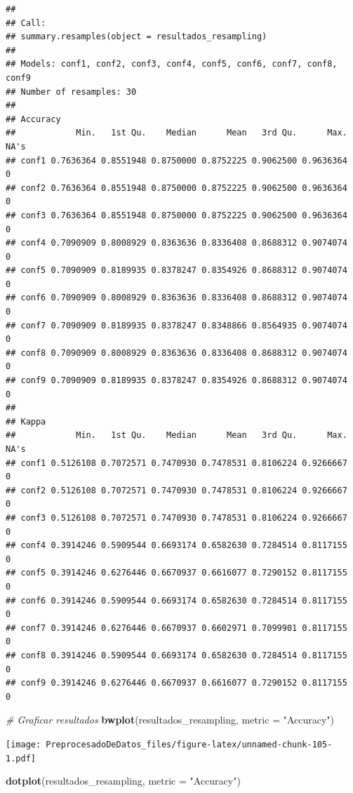 \documentclass[
]{article}
\newenvironment{Shaded}{\begin{snugshade}}{\end{snugshade}}
\newcommand{\AttributeTok}[1]{\textcolor[rgb]{0.13,0.29,0.53}{#1}}
\newcommand{\CommentTok}[1]{\textcolor[rgb]{0.56,0.35,0.01}{\textit{#1}}}
\newcommand{\FunctionTok}[1]{\textcolor[rgb]{0.13,0.29,0.53}{\textbf{#1}}}
\newcommand{\NormalTok}[1]{#1}
\newcommand{\StringTok}[1]{\textcolor[rgb]{0.31,0.60,0.02}{#1}}
\begin{document}
\begin{verbatim}
## 
## Call:
## summary.resamples(object = resultados_resampling)
## 
## Models: conf1, conf2, conf3, conf4, conf5, conf6, conf7, conf8, conf9 
## Number of resamples: 30 
## 
## Accuracy 
##            Min.   1st Qu.    Median      Mean   3rd Qu.      Max. NA's
## conf1 0.7636364 0.8551948 0.8750000 0.8752225 0.9062500 0.9636364    0
## conf2 0.7636364 0.8551948 0.8750000 0.8752225 0.9062500 0.9636364    0
## conf3 0.7636364 0.8551948 0.8750000 0.8752225 0.9062500 0.9636364    0
## conf4 0.7090909 0.8008929 0.8363636 0.8336408 0.8688312 0.9074074    0
## conf5 0.7090909 0.8189935 0.8378247 0.8354926 0.8688312 0.9074074    0
## conf6 0.7090909 0.8008929 0.8363636 0.8336408 0.8688312 0.9074074    0
## conf7 0.7090909 0.8189935 0.8378247 0.8348866 0.8564935 0.9074074    0
## conf8 0.7090909 0.8008929 0.8363636 0.8336408 0.8688312 0.9074074    0
## conf9 0.7090909 0.8189935 0.8378247 0.8354926 0.8688312 0.9074074    0
## 
## Kappa 
##            Min.   1st Qu.    Median      Mean   3rd Qu.      Max. NA's
## conf1 0.5126108 0.7072571 0.7470930 0.7478531 0.8106224 0.9266667    0
## conf2 0.5126108 0.7072571 0.7470930 0.7478531 0.8106224 0.9266667    0
## conf3 0.5126108 0.7072571 0.7470930 0.7478531 0.8106224 0.9266667    0
## conf4 0.3914246 0.5909544 0.6693174 0.6582630 0.7284514 0.8117155    0
## conf5 0.3914246 0.6276446 0.6670937 0.6616077 0.7290152 0.8117155    0
## conf6 0.3914246 0.5909544 0.6693174 0.6582630 0.7284514 0.8117155    0
## conf7 0.3914246 0.6276446 0.6670937 0.6602971 0.7099901 0.8117155    0
## conf8 0.3914246 0.5909544 0.6693174 0.6582630 0.7284514 0.8117155    0
## conf9 0.3914246 0.6276446 0.6670937 0.6616077 0.7290152 0.8117155    0
\end{verbatim}

\begin{Shaded}
\begin{Highlighting}[]
\CommentTok{\# Graficar resultados}
\FunctionTok{bwplot}\NormalTok{(resultados\_resampling, }\AttributeTok{metric =} \StringTok{"Accuracy"}\NormalTok{)}
\end{Highlighting}
\end{Shaded}

\texttt{[image: PreprocesadoDeDatos\_files/figure-latex/unnamed-chunk-105-1.pdf]}

\begin{Shaded}
\begin{Highlighting}[]
\FunctionTok{dotplot}\NormalTok{(resultados\_resampling, }\AttributeTok{metric =} \StringTok{"Accuracy"}\NormalTok{)}
\end{Highlighting}
\end{Shaded}
\end{document}

